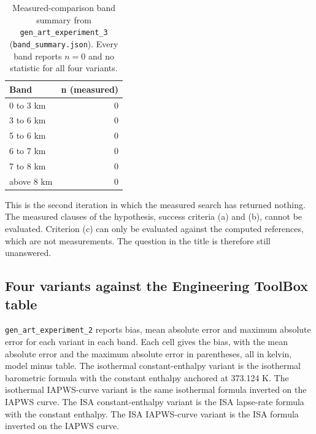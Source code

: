 \documentclass[11pt,letterpaper]{article}
\begin{document}
\begin{table}[!htbp]
\centering\small
\caption{Measured-comparison band summary from \texttt{gen\_art\_experiment\_3} (\texttt{band\_summary.json}). Every band reports $n = 0$ and no statistic for all four variants.}\label{tab:measured3}
\begin{tabular}{lr}
\toprule
Band & n (measured) \\
\midrule
0 to 3 km & 0 \\
3 to 6 km & 0 \\
5 to 6 km & 0 \\
6 to 7 km & 0 \\
7 to 8 km & 0 \\
above 8 km & 0 \\
\bottomrule
\end{tabular}
\end{table}

This is the second iteration in which the measured search has returned nothing. The measured clauses of the hypothesis, success criteria (a) and (b), cannot be evaluated. Criterion (c) can only be evaluated against the computed references, which are not measurements. The question in the title is therefore still unanswered.

\subsection{Four variants against the Engineering ToolBox table}

\texttt{gen\_art\_experiment\_2} reports bias, mean absolute error and maximum absolute error for each variant in each band. Each cell gives the bias, with the mean absolute error and the maximum absolute error in parentheses, all in kelvin, model minus table. The isothermal constant-enthalpy variant is the isothermal barometric formula with the constant enthalpy anchored at 373.124 K. The isothermal IAPWS-curve variant is the same isothermal formula inverted on the IAPWS curve. The ISA constant-enthalpy variant is the ISA lapse-rate formula with the constant enthalpy. The ISA IAPWS-curve variant is the ISA formula inverted on the IAPWS curve.
\end{document}
